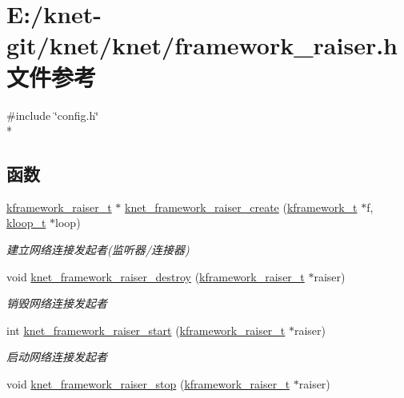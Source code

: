 \hypertarget{a00064}{}\section{E\+:/knet-\/git/knet/knet/framework\+\_\+raiser.h 文件参考}
\label{a00064}
{\ttfamily \#include \char`\"{}config.\+h\char`\"{}}\\*
\subsection*{函数}
\begin{DoxyCompactItemize}
\item 
\hyperlink{a00056_af10637001508cbbf3a84f95c71318532_af10637001508cbbf3a84f95c71318532}{kframework\+\_\+raiser\+\_\+t} $\ast$ \hyperlink{a00064_a2b6bd6bd9b9c60ab24eab0c0700bc855_a2b6bd6bd9b9c60ab24eab0c0700bc855}{knet\+\_\+framework\+\_\+raiser\+\_\+create} (\hyperlink{a00056_a3195a3be35782fc1efb920c811be111d_a3195a3be35782fc1efb920c811be111d}{kframework\+\_\+t} $\ast$f, \hyperlink{a00056_a97fc76209a58362019f1ded9169e397f_a97fc76209a58362019f1ded9169e397f}{kloop\+\_\+t} $\ast$loop)
\begin{DoxyCompactList}\small\item\em 建立网络连接发起者(监听器/连接器) \end{DoxyCompactList}\item 
void \hyperlink{a00064_abafbab78ce889f71a99d7200977507a2_abafbab78ce889f71a99d7200977507a2}{knet\+\_\+framework\+\_\+raiser\+\_\+destroy} (\hyperlink{a00056_af10637001508cbbf3a84f95c71318532_af10637001508cbbf3a84f95c71318532}{kframework\+\_\+raiser\+\_\+t} $\ast$raiser)
\begin{DoxyCompactList}\small\item\em 销毁网络连接发起者 \end{DoxyCompactList}\item 
int \hyperlink{a00064_ad6b3a3a742cf17b521c85962b693efc5_ad6b3a3a742cf17b521c85962b693efc5}{knet\+\_\+framework\+\_\+raiser\+\_\+start} (\hyperlink{a00056_af10637001508cbbf3a84f95c71318532_af10637001508cbbf3a84f95c71318532}{kframework\+\_\+raiser\+\_\+t} $\ast$raiser)
\begin{DoxyCompactList}\small\item\em 启动网络连接发起者 \end{DoxyCompactList}\item 
void \hyperlink{a00064_a6e9cfd9d165129b0099e929885aa78e5_a6e9cfd9d165129b0099e929885aa78e5}{knet\+\_\+framework\+\_\+raiser\+\_\+stop} (\hyperlink{a00056_af10637001508cbbf3a84f95c71318532_af10637001508cbbf3a84f95c71318532}{kframework\+\_\+raiser\+\_\+t} $\ast$raiser)

\end{DoxyCompactItemize}
